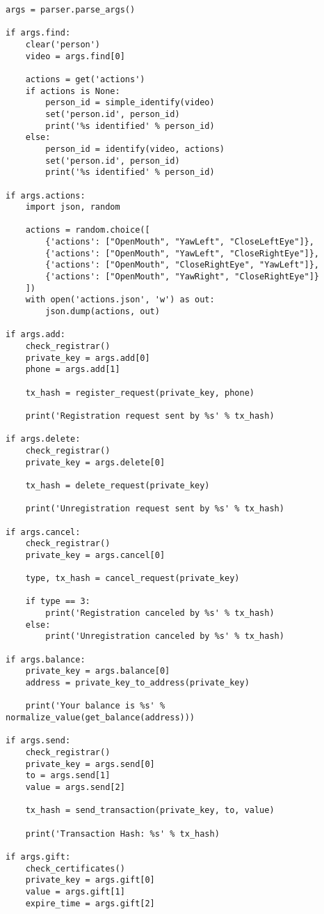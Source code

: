 \begin{verbatim}
args = parser.parse_args()

if args.find:
    clear('person')
    video = args.find[0]

    actions = get('actions')
    if actions is None:
        person_id = simple_identify(video)
        set('person.id', person_id)
        print('%s identified' % person_id)
    else:
        person_id = identify(video, actions)
        set('person.id', person_id)
        print('%s identified' % person_id)

if args.actions:
    import json, random

    actions = random.choice([
        {'actions': ["OpenMouth", "YawLeft", "CloseLeftEye"]},
        {'actions': ["OpenMouth", "YawLeft", "CloseRightEye"]},
        {'actions': ["OpenMouth", "CloseRightEye", "YawLeft"]},
        {'actions': ["OpenMouth", "YawRight", "CloseRightEye"]}
    ])
    with open('actions.json', 'w') as out:
        json.dump(actions, out)

if args.add:
    check_registrar()
    private_key = args.add[0]
    phone = args.add[1]

    tx_hash = register_request(private_key, phone)

    print('Registration request sent by %s' % tx_hash)

if args.delete:
    check_registrar()
    private_key = args.delete[0]

    tx_hash = delete_request(private_key)

    print('Unregistration request sent by %s' % tx_hash)

if args.cancel:
    check_registrar()
    private_key = args.cancel[0]

    type, tx_hash = cancel_request(private_key)

    if type == 3:
        print('Registration canceled by %s' % tx_hash)
    else:
        print('Unregistration canceled by %s' % tx_hash)

if args.balance:
    private_key = args.balance[0]
    address = private_key_to_address(private_key)

    print('Your balance is %s' % normalize_value(get_balance(address)))

if args.send:
    check_registrar()
    private_key = args.send[0]
    to = args.send[1]
    value = args.send[2]

    tx_hash = send_transaction(private_key, to, value)

    print('Transaction Hash: %s' % tx_hash)

if args.gift:
    check_certificates()
    private_key = args.gift[0]
    value = args.gift[1]
    expire_time = args.gift[2]


\end{verbatim}
